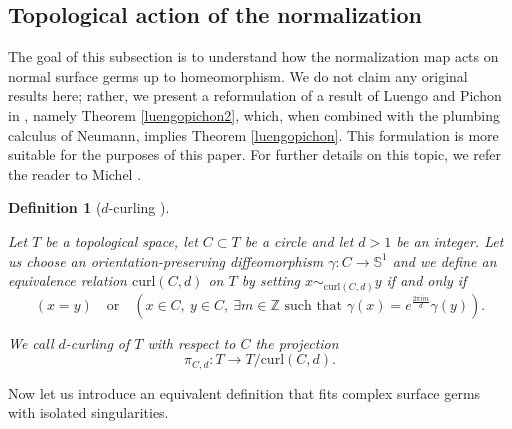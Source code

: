 \documentclass[reqno,dvipsnames,12pt]{amsart}
\newtheorem{defi}[thm]{Definition}
\begin{document}
\subsection{Topological action of the normalization}
The goal of this subsection is to understand how the normalization map acts on normal surface germs up to homeomorphism. We do not claim any original results here; rather, we present a reformulation of a result of Luengo and Pichon in \cite{luengopichon}, namely Theorem \ref{luengopichon2}, which, when combined with the plumbing calculus of Neumann, implies Theorem \ref{luengopichon}. This formulation is more suitable for the purposes of this paper. For further details on this topic, we refer the reader to Michel \cite[Section 2]{michelnormalization}.


\begin{defi}[{$d$-curling \cite[Section 2]{luengopichon}}]\label{curling1}

Let $T$ be a topological space, let $C\subset T$ be a circle and let
$d>1$ be an integer. Let us choose an orientation-preserving diffeomorphism $\gamma:C\longrightarrow \mathbb{S}^1$ and we define an equivalence relation $\mathrm{curl}(C,d)$ on $T$ by setting
$x\sim_{\mathrm{curl}(C,d)} y$ if and only if
\[
(x=y)
\quad\text{or}\quad
\left(
x\in C,\ y\in C,\ \exists m\in\mathbb Z
\text{ such that }
\gamma(x)=e^{\frac{2\pi i m}{d}}\gamma(y)
\right).
\]

We call $d$-curling of $T$ with respect to $C$ the projection
\[
\pi_{C,d}:T\longrightarrow T/\mathrm{curl}(C,d).
\]
\end{defi}


Now let us introduce an equivalent definition that fits complex surface germs with isolated singularities.
\end{document}
